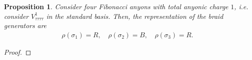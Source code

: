 \documentclass[a4paper,10pt,oneside]{book}
\makeatletter
\theoremstyle{plain}
\newtheorem{proposition}[theorem]{Proposition}
\theoremstyle{definition}
\theoremstyle{remark}
\newcounter{mycounter}
\newcommand{\fs}[3][]{
  \begin{tikzpicture}[scale=0.3,font=\footnotesize,anchor=mid,baseline={([yshift=-.5ex]current bounding box.center)}]
    \def\height{1.5}
    \def\offset{0.5}
    \ifthenelse{\equal{#1}{}}{\def\height{1}}{} %
    \setcounter{mycounter}{0}
    \@for\el:=#2\do{
      \ifthenelse{\equal{#1}{\value{mycounter}}}{
        \braid at (\value{mycounter},\height) s_1^{-1};
        \stepcounter{mycounter}
      }{
        \stepcounter{mycounter}
        \ifthenelse{\equal{#1}{\value{mycounter}}}{
        }{
          \draw (\value{mycounter}, \height) to (\value{mycounter}, 0);
        }
      }
      \node at (\value{mycounter}, \height+\offset) {$\el$};
    }
    \draw (0, 0) to (\value{mycounter}+1, 0);
    \setcounter{mycounter}{0}
    \@for\el:=#3\do{
      \node at (\value{mycounter}+0.5, -0.6) {$\el$};
      \stepcounter{mycounter}
    }
  \end{tikzpicture}
}
\makeatother
\begin{document}
{\begin{proposition}
  Consider four Fibonacci anyons with total anyonic charge $1$, i.e. consider $V_{\tau\tau\tau\tau}^1$ in the standard basis. Then, the representation of the braid generators are
  \begin{align*}
    \rho(\sigma_1) = R,\quad
    \rho(\sigma_2) = B,\quad
    \rho(\sigma_3) = R.
  \end{align*}
\end{proposition}

\begin{proof}


\end{proof}}
\end{document}
